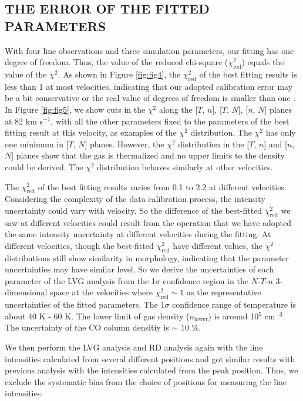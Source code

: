 \subsection{THE ERROR OF THE FITTED PARAMETERS}

With four line observations and three simulation parameters, our fitting has one degree of freedom. Thus, the value of the reduced chi-square ($\chi^2_{\mathrm{red}}$) equals the value of the $\chi^2$. As shown in Figure \ref{fig:fig4}, the $\chi^2_{\mathrm{red}}$ of the best fitting results is less than 1 at most velocities, indicating that our adopted calibration error may be a bit conservative or the real value of degrees of freedom is smaller than one \citep{2010arXiv1012.3754A}. In Figure \ref{fig:fig5}, we show cuts in the $\chi^2$ along the [$T$, $n$], [$T$, $N$], [$n$, $N$] planes at 82 km s$^{-1}$, with all the other parameters fixed to the parameters of the best fitting result at this velocity, as examples of the $\chi^2$ distribution. The $\chi^2$ has only one minimum in [$T$, $N$] planes. However, the $\chi^2$ distribution in the [$T$, $n$] and [$n$, $N$] planes show that the gas is thermalized and no upper limits to the density could be derived. The $\chi^2$ distribution behaves similarly at other velocities. 

The $\chi^2_{\mathrm{red}}$ of the best fitting results varies from 0.1 to 2.2 at different velocities. Considering the complexity of the data calibration process, the intensity uncertainty could vary with velocity. So the difference of the best-fitted $\chi^2_{\mathrm{red}}$ we saw at different velocities could result from the operation that we have adopted the same intensity uncertainty at different velocities during the fitting. At different velocities, though the best-fitted $\chi^2_{\mathrm{red}}$ have different values, the $\chi^2$ distributions still show similarity in morphology, indicating that the parameter uncertainties may have similar level. So we derive the uncertainties of each parameter of the LVG analysis from the 1$\sigma$ confidence region in the $N$-$T$-$n$ 3-dimensional space at the velocities where $\chi^2_{\mathrm{red}} \sim 1$ as the representative uncertainties of the fitted parameters. The 1$\sigma$ confidence range of temperature is about 40 K - 60 K. The lower limit of gas density ($n_{\mathrm{lower}}$) is around 10$^5$ cm$^{-3}$. The uncertainty of the CO column densitiy is $\sim$ 10 \%. 

We then perform the LVG analysis and RD analysis again with the line intensities calculated from several different positions and got similar results with previous analysis with the intensities calculated from the peak position. Thus, we exclude the systematic bias from the choice of positions for measuring the line intensities.

